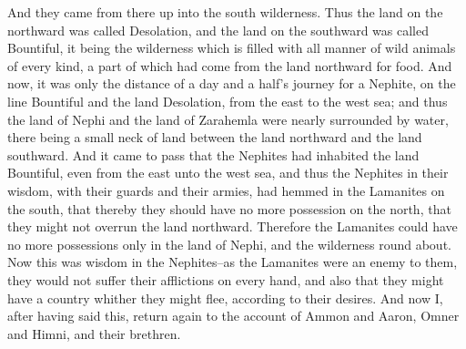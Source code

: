 And they came from there up into the south wilderness. Thus the land on the northward was called Desolation, and the land on the southward was called Bountiful, it being the wilderness which is filled with all manner of wild animals of every kind, a part of which had come from the land northward for food.
\bverse \iffalse And now, it was only the distance of a day and a half's journey for a Nephite, on the line Bountiful and the land Desolation, from the east to the west sea; and thus the land of Nephi and the land of Zarahemla were nearly surrounded by water, there being a small neck of land between the land northward and the land southward. \fi
And now, it was only the distance of a day and a half's journey for a Nephite, on the line Bountiful and the land Desolation, from the east to the west sea; and thus the land of Nephi and the land of Zarahemla were nearly surrounded by water, there being a small neck of land between the land northward and the land southward.
\bverse \iffalse And it came to pass that the Nephites had inhabited the land Bountiful, even from the east unto the west sea, and thus the Nephites in their wisdom, with their guards and their armies, had hemmed in the Lamanites on the south, that thereby they should have no more possession on the north, that they might not overrun the land northward. \fi
And it came to pass that the Nephites had inhabited the land Bountiful, even from the east unto the west sea, and thus the Nephites in their wisdom, with their guards and their armies, had hemmed in the Lamanites on the south, that thereby they should have no more possession on the north, that they might not overrun the land northward.
\bverse \iffalse Therefore the Lamanites could have no more possessions only in the land of Nephi, and the wilderness round about. Now this was wisdom in the Nephites--as the Lamanites were an enemy to them, they would not suffer their afflictions on every hand, and also that they might have a country whither they might flee, according to their desires. \fi
Therefore the Lamanites could have no more possessions only in the land of Nephi, and the wilderness round about. Now this was wisdom in the Nephites--as the Lamanites were an enemy to them, they would not suffer their afflictions on every hand, and also that they might have a country whither they might flee, according to their desires.
\bverse \iffalse And now I, after having said this, return again to the account of Ammon and Aaron, Omner and Himni, and their brethren. \fi
And now I, after having said this, return again to the account of Ammon and Aaron, Omner and Himni, and their brethren.

